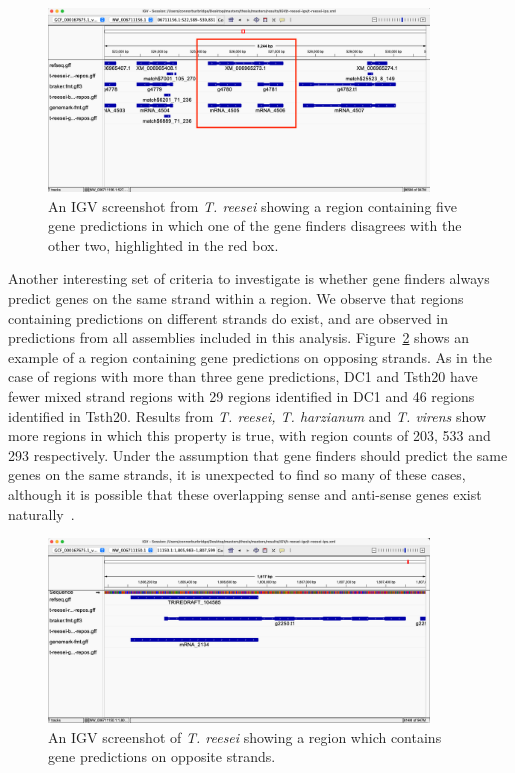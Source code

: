 \begin{figure}
  \centering
  \includegraphics[width=0.9\textwidth]{figures/igv/igv-uncertain-regions.png}
  \caption[Example of a region with many gene calls]{An IGV screenshot
    from \textit{T. reesei} showing a region containing five gene
    predictions in which one of the gene finders disagrees with the
    other two, highlighted in the red box.}\label{fig:uncertain-regions}
\end{figure}

Another interesting set of criteria to investigate is whether
gene finders always predict genes on the same strand within a
region. We observe that regions containing predictions on different
strands do exist, and are observed in predictions from all assemblies
included in this analysis. Figure~\ref{fig:opposing-strands} shows an
example of a region containing gene predictions on opposing
strands. As in the case of regions with more than three gene
predictions, DC1 and Tsth20 have fewer mixed strand regions with 29
regions identified in DC1 and 46 regions identified in Tsth20. Results
from \textit{T. reesei, T. harzianum} and \textit{T. virens} show more
regions in which this property is true, with region counts of 203, 533
and 293 respectively. Under the assumption that gene finders should
predict the same genes on the same strands, it is unexpected to find
so many of these cases, although it is possible that these overlapping
sense and anti-sense genes exist naturally~\cite{wright2022a}.

\begin{figure}
  \centering
  \includegraphics[width=0.9\textwidth]{figures/igv/igv-opposing-strands.png}
  \caption[Predictions on opposing strands]{An IGV screenshot of
    \textit{T. reesei} showing a region which contains gene
    predictions on opposite strands.}\label{fig:opposing-strands}
\end{figure}

